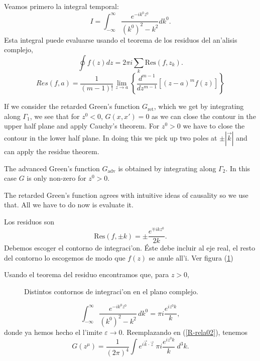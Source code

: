  Veamos primero la integral temporal:%
 \begin{equation}
 I=\int_{-\infty}^{\infty}\frac{e^{-ik^0z^0}}{(k^0)^2-k^2}dk^0.
 \end{equation}
 Esta integral puede evaluarse usando el teorema de los residuos
 del
 an'alisis complejo,%
 \begin{equation}
 \oint f\left(  z\right)  dz=2\pi i\sum_{k}\text{Res}\left(
 f,z_{k}\right)  .
 \end{equation}
 \begin{equation}
 Res(f,a)=\frac{1}{\left(  m-1\right)
 !}\underset{z\rightarrow a}{\lim}\left\{  \frac{ d^{m-1}}{ d%
 z^{m-1}}\left[  \left(  z-a\right)  ^{m}f\left(  z\right)  \right]  \right\}
 \end{equation}

 If we consider the retarded Green's function $G_{\text{ret}}$,
 which we get by integrating along $\Gamma_1$, we see that
 for $z^0 < 0$, $G(x,x') = 0$ as we can close the contour
 in the upper half plane and apply Cauchy's theorem.  For
 $z^0 > 0$ we have to close the contour in the lower half plane.  In doing
 this we pick up two poles at $\pm |\vec{k}|$ and can apply the residue
 theorem.

 The advanced Green's function $G_{\text{adv}}$ is obtained by
 integrating along $\Gamma_2$.  In this case $G$ is only non-zero
 for $z^0 > 0$.

 The retarded Green's function agrees with intuitive
 ideas of causality so we use that.  All we have to do now is
 evaluate it.

 Los residuos son
 \begin{equation}
 \text{Res}\left(  f,\pm k\right)  =\pm \frac{e^{\mp ikz^0}}{2k}.
 \end{equation}
 Debemos escoger el contorno de integraci'on. \'{E}ste debe
 incluir al eje real, el resto del contorno lo escogemos de modo
 que $f\left(  z\right)  $ se
 anule all'i. Ver figura (\ref{contornos})

 Usando el teorema del residuo encontramos que, para $z>0$,
 \begin{figure}[h]
 \centerline{}
 \caption{Distintos contornos de integraci'on en el plano complejo.}
 \label{contornos}
 \end{figure}
 \begin{equation}
 \int_{-\infty}^{\infty}\frac{e^{-ik^0 z^0}}{(k^0)^2-k^2}\,dk^0=\pi
 i\frac{e^{iz^0k}}{k},
 \end{equation}
 donde ya hemos hecho el l'imite $\varepsilon\rightarrow0$.
 Reemplazando en (\ref{R-rela02}), tenemos%
 \begin{equation}
 G(z^\mu)  =\frac{1}{(2\pi)  ^4}\int
 e^{i\vec{k}\cdot\vec{z}}~\pi i\frac{e^{iz^0k}}{k}~d^3k.
 \end{equation}

